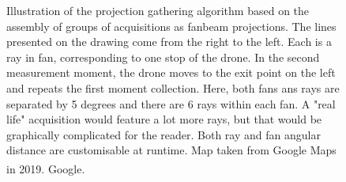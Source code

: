 \begin{figure}[htpb]
    \centering

    \caption{ Illustration of the projection gathering algorithm based
    on the assembly of groups of acquisitions as fanbeam projections.
    The lines presented on the drawing come from the right to the left. Each
    is a ray in fan, corresponding to one stop of the drone. In the second
    measurement moment, the drone moves to the exit point on the left and
    repeats the first moment collection. Here, both fans ans rays are
    separated by 5 degrees and there are 6 rays within each fan. A "real
    life" acquisition would feature a lot more rays, but that would be
    graphically complicated for the reader. Both ray and fan angular
    distance are customisable at runtime. Map taken from Google Maps in
    2019. \textsuperscript{\textcopyright}Google.}
    \label{fig:illustriated_trajectory_and_fanbeam_formation}
\end{figure}

